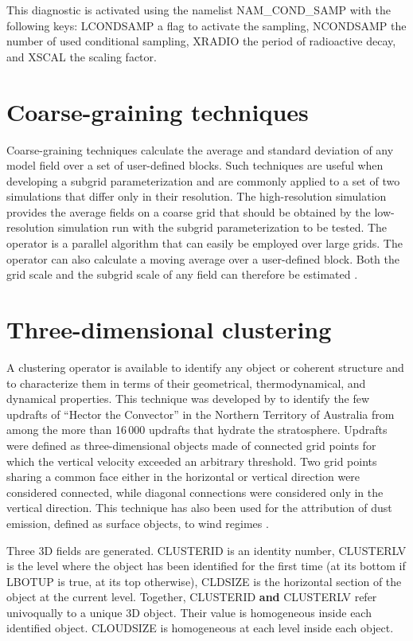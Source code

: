 This diagnostic is activated using the namelist NAM\_COND\_SAMP with the following keys:  LCONDSAMP a flag to activate the sampling, NCONDSAMP the number of used conditional sampling, XRADIO the period of radioactive decay, and XSCAL the scaling factor.
%
\section{Coarse-graining techniques}
%
Coarse-graining techniques calculate the average and standard deviation of
any model field over a set of user-defined blocks. Such techniques are useful
when developing a subgrid parameterization and are commonly applied to a set
of two simulations that differ only in their resolution. The high-resolution
simulation provides the average fields on a coarse grid that should be
obtained by the low-resolution simulation run with the subgrid
parameterization to be tested. The operator is a parallel algorithm that can
easily be employed over large grids. The operator can also calculate a moving
average over a user-defined block. Both the grid scale and the subgrid scale
of any field can therefore be estimated \citep{Dauhut2016}.
%
\section{Three-dimensional clustering}
%
A clustering operator is available to identify any object or coherent
structure and to characterize them in terms of their geometrical,
thermodynamical, and dynamical properties. This technique was developed by
\citet{Dauhut2016} to identify the few updrafts of ``Hector the Convector'' in
the Northern Territory of Australia from among the more than 16\,000
updrafts that hydrate the stratosphere. Updrafts were defined as
three-dimensional objects made of connected grid points for which the
vertical velocity exceeded an arbitrary threshold. Two grid points sharing a
common face either in the horizontal or vertical direction were considered
connected, while diagonal connections were considered only in the vertical
direction. This technique has also been used for the attribution of dust
emission, defined as surface objects, to wind regimes \citep{Chaboureau2016}.

Three 3D fields are generated. CLUSTERID is an identity number, CLUSTERLV is the level where the object has been identified for the first time (at its bottom if LBOTUP is true, at its top otherwise), CLDSIZE is the horizontal section of the object at the current level.
Together, CLUSTERID \textbf{and} CLUSTERLV refer univoqually to a unique 3D object. Their value is homogeneous inside each identified object. CLOUDSIZE is homogeneous at each level inside each object. 

